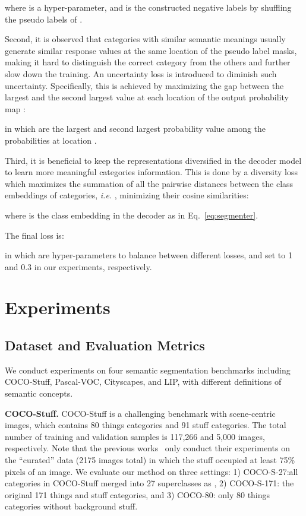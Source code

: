 \documentclass[runningheads]{llncs}
\def\ie{\emph{i.e. }}
\newcommand{\PAR}[1]{\smallskip \noindent \textbf{#1}}
\begin{document}
where  is a hyper-parameter, and  is the constructed negative labels by shuffling the  pseudo labels of .

Second, it is observed that categories with similar semantic meanings usually generate similar response values at the same location of the pseudo label masks, making it hard to distinguish the correct category from the others and further slow down the training.  An uncertainty loss is introduced to diminish such uncertainty. Specifically, this is achieved by maximizing the gap between the largest and the second largest value at each location of the output probability map :

in which  are the largest and second largest probability value among the  probabilities at location . 

Third, it is beneficial to keep the representations diversified in the decoder model to learn more meaningful categories information. This is done by a diversity loss which maximizes the summation of all the pairwise distances between the class embeddings of  categories, \ie, minimizing their cosine similarities: 

where  is the class embedding in the decoder as in Eq.~\ref{eq:segmenter}.

The final loss is:

in which  are hyper-parameters to balance between different losses, and set to 1 and 0.3 in our experiments, respectively.

\section{Experiments}


\subsection{Dataset and Evaluation Metrics}

We conduct experiments on four semantic segmentation benchmarks including COCO-Stuff, Pascal-VOC, Cityscapes, and LIP, with different definitions of semantic concepts.

\PAR{COCO-Stuff.} COCO-Stuff is a challenging benchmark with scene-centric images, which contains 80 things categories and 91 stuff categories. The total number of training and validation samples is 117,266 and 5,000 images, respectively. Note that the previous works~\cite{PiCIE,IIC} only conduct their experiments on the ``curated'' data (2175 images total) in which the stuff occupied at least 75\% pixels of an image. We evaluate our method on three settings: 1) COCO-S-27:all categories in COCO-Stuff merged into 27 superclasses as \cite{PiCIE}, 2) COCO-S-171: the original 171 things and stuff categories, and 3) COCO-80: only 80 things categories without background stuff.
\end{document}

